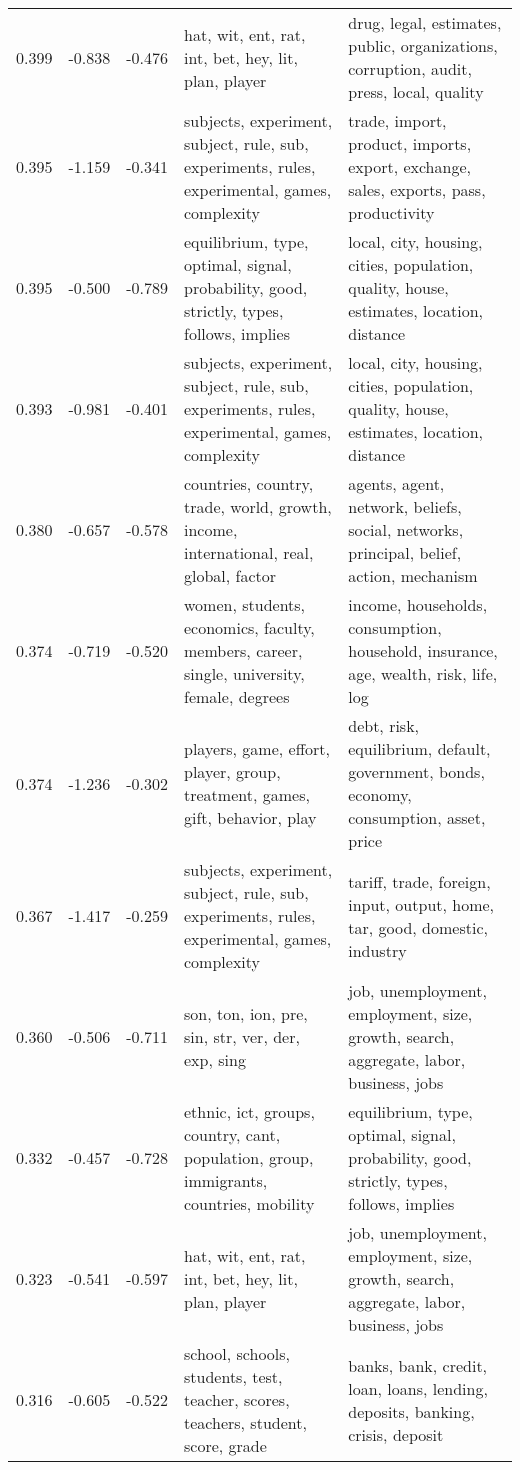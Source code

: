 \begin{tabular}{cccp{5cm}p{5cm}}
0.399 & -0.838 & -0.476 & hat, wit, ent, rat, int, bet, hey, lit, plan, player & drug, legal, estimates, public, organizations, corruption, audit, press, local, quality \\
0.395 & -1.159 & -0.341 & subjects, experiment, subject, rule, sub, experiments, rules, experimental, games, complexity & trade, import, product, imports, export, exchange, sales, exports, pass, productivity \\
0.395 & -0.500 & -0.789 & equilibrium, type, optimal, signal, probability, good, strictly, types, follows, implies & local, city, housing, cities, population, quality, house, estimates, location, distance \\
0.393 & -0.981 & -0.401 & subjects, experiment, subject, rule, sub, experiments, rules, experimental, games, complexity & local, city, housing, cities, population, quality, house, estimates, location, distance \\
0.380 & -0.657 & -0.578 & countries, country, trade, world, growth, income, international, real, global, factor & agents, agent, network, beliefs, social, networks, principal, belief, action, mechanism \\
0.374 & -0.719 & -0.520 & women, students, economics, faculty, members, career, single, university, female, degrees & income, households, consumption, household, insurance, age, wealth, risk, life, log \\
0.374 & -1.236 & -0.302 & players, game, effort, player, group, treatment, games, gift, behavior, play & debt, risk, equilibrium, default, government, bonds, economy, consumption, asset, price \\
0.367 & -1.417 & -0.259 & subjects, experiment, subject, rule, sub, experiments, rules, experimental, games, complexity & tariff, trade, foreign, input, output, home, tar, good, domestic, industry \\
0.360 & -0.506 & -0.711 & son, ton, ion, pre, sin, str, ver, der, exp, sing & job, unemployment, employment, size, growth, search, aggregate, labor, business, jobs \\
0.332 & -0.457 & -0.728 & ethnic, ict, groups, country, cant, population, group, immigrants, countries, mobility & equilibrium, type, optimal, signal, probability, good, strictly, types, follows, implies \\
0.323 & -0.541 & -0.597 & hat, wit, ent, rat, int, bet, hey, lit, plan, player & job, unemployment, employment, size, growth, search, aggregate, labor, business, jobs \\
0.316 & -0.605 & -0.522 & school, schools, students, test, teacher, scores, teachers, student, score, grade & banks, bank, credit, loan, loans, lending, deposits, banking, crisis, deposit \\

\end{tabular}

